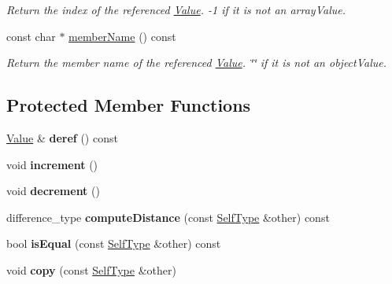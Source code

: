 \begin{DoxyCompactItemize}
\begin{DoxyCompactList}\small\item\em Return the index of the referenced \hyperlink{class_json_1_1_value}{Value}. -\/1 if it is not an array\-Value. \end{DoxyCompactList}\item 
\hypertarget{class_json_1_1_value_iterator_base_a83768d87c608c8d1133de8721eefc31b}{const char $\ast$ \hyperlink{class_json_1_1_value_iterator_base_a83768d87c608c8d1133de8721eefc31b}{member\-Name} () const }\label{class_json_1_1_value_iterator_base_a83768d87c608c8d1133de8721eefc31b}

\begin{DoxyCompactList}\small\item\em Return the member name of the referenced \hyperlink{class_json_1_1_value}{Value}. \char`\"{}\char`\"{} if it is not an object\-Value. \end{DoxyCompactList}\end{DoxyCompactItemize}
\subsection*{Protected Member Functions}
\begin{DoxyCompactItemize}
\item 
\hypertarget{class_json_1_1_value_iterator_base_a40a20c65abc423a26e3aae68d9a0525c}{\hyperlink{class_json_1_1_value}{Value} \& {\bfseries deref} () const }\label{class_json_1_1_value_iterator_base_a40a20c65abc423a26e3aae68d9a0525c}

\item 
\hypertarget{class_json_1_1_value_iterator_base_afe58f9534e1fd2033419fd9fe244551e}{void {\bfseries increment} ()}\label{class_json_1_1_value_iterator_base_afe58f9534e1fd2033419fd9fe244551e}

\item 
\hypertarget{class_json_1_1_value_iterator_base_affc8cf5ff54a9f432cc693362c153fa6}{void {\bfseries decrement} ()}\label{class_json_1_1_value_iterator_base_affc8cf5ff54a9f432cc693362c153fa6}

\item 
\hypertarget{class_json_1_1_value_iterator_base_ad6c553b249e89e3dc9933e100ccbe064}{difference\-\_\-type {\bfseries compute\-Distance} (const \hyperlink{class_json_1_1_value_iterator_base}{Self\-Type} \&other) const }\label{class_json_1_1_value_iterator_base_ad6c553b249e89e3dc9933e100ccbe064}

\item 
\hypertarget{class_json_1_1_value_iterator_base_a21820d6ee564e541bd118b21e4741962}{bool {\bfseries is\-Equal} (const \hyperlink{class_json_1_1_value_iterator_base}{Self\-Type} \&other) const }\label{class_json_1_1_value_iterator_base_a21820d6ee564e541bd118b21e4741962}

\item 
\hypertarget{class_json_1_1_value_iterator_base_a496e6aba44808433ec5858c178be5719}{void {\bfseries copy} (const \hyperlink{class_json_1_1_value_iterator_base}{Self\-Type} \&other)}\label{class_json_1_1_value_iterator_base_a496e6aba44808433ec5858c178be5719}

\end{DoxyCompactItemize}


